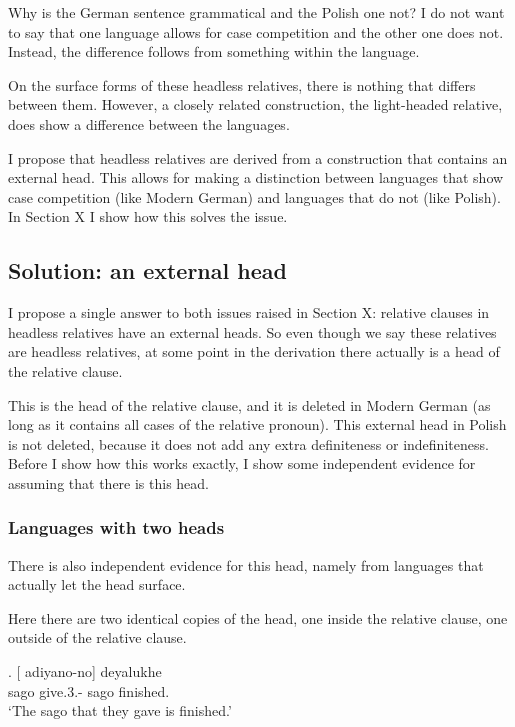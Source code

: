 Why is the German sentence grammatical and the Polish one not? I do not want to say that one language allows for case competition and the other one does not. Instead, the difference follows from something within the language.

On the surface forms of these headless relatives, there is nothing that differs between them. However, a closely related construction, the light-headed relative, does show a difference between the languages.

I propose that headless relatives are derived from a construction that contains an external head. This allows for making a distinction between languages that show case competition (like Modern German) and languages that do not (like Polish). In Section X I show how this solves the issue.



\subsection{Solution: an external head}

I propose a single answer to both issues raised in Section X: relative clauses in headless relatives have an external heads. So even though we say these relatives are headless relatives, at some point in the derivation there actually is a head of the relative clause.

This is the head of the relative clause, and it is deleted in Modern German (as long as it contains all cases of the relative pronoun). This external head in Polish is not deleted, because it does not add any extra definiteness or indefiniteness. Before I show how this works exactly, I show some independent evidence for assuming that there is this head.


\subsubsection{Languages with two heads}

There is also independent evidence for this head, namely from languages that actually let the head surface.

Here there are two identical copies of the head, one inside the relative clause, one outside of the relative clause.

\exg. [ adiyano-no]  deyalukhe\\
 sago give.3.- sago finished.\\
 `The sago that they gave is finished.' 

